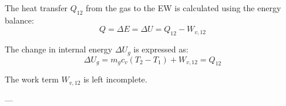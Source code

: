 The heat transfer \( Q_{12} \) from the gas to the EW is calculated using the energy balance:  
\[
Q = \Delta E = \Delta U = Q_{12} - W_{v,12}
\]  

The change in internal energy \( \Delta U_g \) is expressed as:  
\[
\Delta U_g = m_g c_v (T_2 - T_1) + W_{v,12} = Q_{12}
\]  

The work term \( W_{v,12} \) is left incomplete.  

---